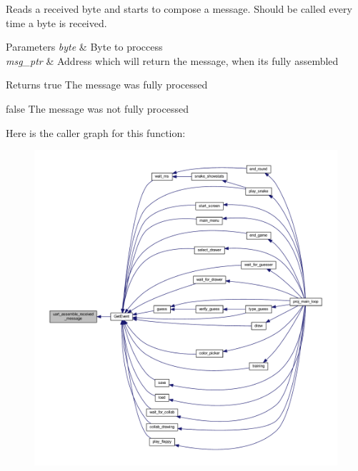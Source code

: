 Reads a received byte and starts to compose a message. Should be called every time a byte is received. 


\begin{DoxyParams}{Parameters}
{\em byte} & Byte to proccess \\
\hline
{\em msg\+\_\+ptr} & Address which will return the message, when it\textquotesingle{}s fully assembled \\
\hline
\end{DoxyParams}
\begin{DoxyReturn}{Returns}
true The message was fully processed 

false The message was not fully processed 
\end{DoxyReturn}
Here is the caller graph for this function\+:\nopagebreak
\begin{figure}[H]
\begin{center}
\leavevmode
\includegraphics[width=350pt]{group__uart__protocol_gaf24bc3ddb7d648a8a12a221c7a2e75af_icgraph}
\end{center}
\end{figure}
\mbox{\label{group__uart__protocol_ga135e4c7043b1c4cd01caa52830b459de}} 
